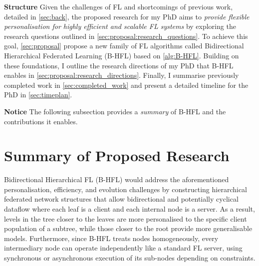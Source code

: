 \noindent \textbf{Structure} Given the challenges of FL and shortcomings of previous work, detailed in \cref{sec:back}, the proposed research for my PhD aims to \emph{provide flexible personalisation for highly efficient and scalable FL systems} by exploring the research questions outlined in \cref{sec:proposal:research_questions}. To achieve this goal, \cref{sec:proposal} propose a new family of FL algorithms called Bidirectional Hierarchical Federated Learning (B-HFL) based on \cref{alg:B-HFL}. Building on these foundations, I outline the research directions of my PhD that B-HFL enables in \cref{sec:proposal:research_directions}. Finally, I summarise previously completed work in \cref{sec:completed_work} and present a detailed timeline for the PhD in \cref{sec:timeplan}.

\noindent \textbf{Notice} The following subsection provides a \emph{summary} of B-HFL and the contributions it enables.
\section{Summary of Proposed Research}
Bidirectional Hierarchical FL (B-HFL) would address the aforementioned personalisation, efficiency, and evolution challenges by constructing hierarchical federated network structures that allow bidirectional and potentially cyclical dataflow where each leaf is a client and each internal node is a server. As a result, levels in the tree closer to the leaves are more personalised to the specific client population of a subtree, while those closer to the root provide more generalisable models. Furthermore, since B-HFL treats nodes homogeneously, every intermediary node can operate independently like a standard FL server, using synchronous or asynchronous execution of its sub-nodes depending on constraints.

